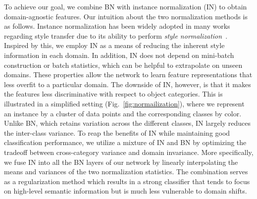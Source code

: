 \documentclass[runningheads]{llncs}
\begin{document}
\begin{table}[!t]
	\begin{center}
	\caption{Effects of training batch normalization on the PACS dataset using a ResNet-18 architecture.
	Each column shows the performance on the target domain when a network is trained using the remaining domains as sources.
	Fine-tuning BN parameters degrades the generalization performance by overfitting to source domains.
	}
	\label{tab:bn}
\end{center}
\end{table}


To achieve our goal, we combine BN with instance normalization (IN) to obtain domain-agnostic features.
Our intuition about the two normalization methods is as follows.
Instance normalization has been widely adopted in many works regarding style transfer due to its ability to perform \textit{style normalization}~\cite{AdaIn2017}.
Inspired by this, we employ IN as a means of reducing the inherent style information in each domain. 
In addition, IN does not depend on mini-batch construction or batch statistics, which can be helpful to extrapolate on unseen domains.
These properties allow the network to learn feature representations that less overfit to a particular domain.
The downside of IN, however, is that it makes the features less discriminative with respect to object categories. This is illustrated in a simplified setting (Fig.~\ref{fig:normailization}), where we represent an instance by a cluster of data points and the corresponding classes by color. Unlike BN, which retains variation across the different classes, IN largely reduces the inter-class variance. To reap the benefits of IN while maintaining good classification performance, we utilize a mixture of IN and BN by optimizing the tradeoff between cross-category variance and domain invariance. More specifically, we fuse IN into all the BN layers of our network by linearly interpolating the means and variances of the two normalization statistics. The combination serves as a regularization method which results in a strong classifier that tends to focus on high-level semantic information but is much less vulnerable to domain shifts.
\end{document}
